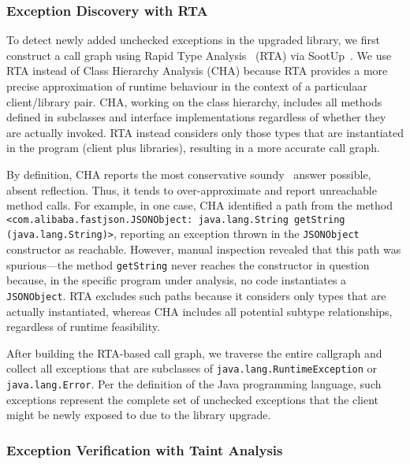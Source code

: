 \subsubsection{Exception Discovery with RTA}

To detect newly added unchecked exceptions in the upgraded library, we first construct a call graph using Rapid Type Analysis~\cite{bacon96:_fast_static_analy_c_virtual_funct_calls} (RTA) via SootUp~\cite{Karakaya24:_sootup}. We use RTA instead of Class Hierarchy Analysis (CHA) because RTA provides a more precise approximation of runtime behaviour in the context of a particulaar client/library pair. CHA, working on the class hierarchy, includes all methods defined in subclasses and interface implementations regardless of whether they are actually invoked. RTA instead considers only those types that are instantiated in the program (client plus libraries), resulting in a more accurate call graph.

By definition, CHA reports the most conservative soundy~\cite{livshits15:_in} answer possible, absent reflection. Thus, it tends to over-approximate and report unreachable method calls. For example, in one case, CHA identified a path from the method \texttt{<com.alibaba.fastjson.JSONObject: java.lang.String getString (java.lang.String)>}, reporting an exception thrown in the \texttt{JSONObject} constructor as reachable. However, manual inspection revealed that this path was spurious—the method \texttt{getString} never reaches the constructor in question because, in the specific program under analysis, no code instantiates a \texttt{JSONObject}. RTA excludes such paths because it considers only types that are actually instantiated, whereas CHA includes all potential subtype relationships, regardless of runtime feasibility.

After building the RTA-based call graph, we traverse the entire callgraph and collect all exceptions that are subclasses of \texttt{java.lang.RuntimeException} or \texttt{java.lang.Error}. Per the definition of the Java programming language, such exceptions represent the complete set of unchecked exceptions that the client might be newly exposed to due to the library upgrade.

\subsubsection{Exception Verification with Taint Analysis}

